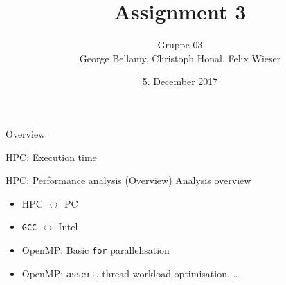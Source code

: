 \documentclass[shortpres]{beamer}
\title[{Tsunami simulation}]{Assignment 3}
\author[Bellamy, Honal, Wieser]{Gruppe 03\\George Bellamy, Christoph Honal, Felix Wieser\\\vspace{10pt}{\small Bachelorpraktikum}}
\institute[TU M\"unchen]{Technical University of Munich}
\date{5. December 2017}
\begin{document}
\maketitle

\begin{frame}{Overview}
	\begin{figure}
		\hspace{40pt}
	\end{figure}
\end{frame}

\begin{frame}{HPC: Execution time}
\end{frame}

\begin{frame}[fragile]{HPC: Performance analysis (Overview)}
	Analysis overview
	\begin{itemize}
		\item HPC $\leftrightarrow$ PC
		\item \verb|GCC| $\leftrightarrow$ Intel
		\item OpenMP: Basic \verb|for| parallelisation
		\item OpenMP: \verb|assert|, thread workload optimisation, \dots
	\end{itemize}
\end{frame}
\end{document}
